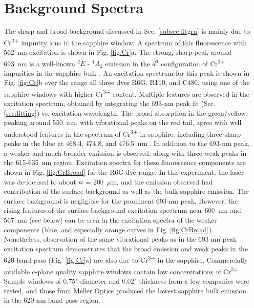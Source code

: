 \section{Background Spectra}
\label{sec:bgs} %

The sharp and broad background discussed in Sec. \ref{subsec:fitgrn} is mainly due to Cr\textsuperscript{3+} impurity ions in the sapphire window.  A spectrum of this fluorescence with 562~nm excitation is shown in Fig. \ref{fig:Cr}a.  The strong, sharp peak around 693~nm is a well-known $^{2}E$ - $^{4}A_{2}$ emission in the $d^{3}$ configuration of Cr\textsuperscript{3+} impurities in the sapphire bulk \cite{SapphireRlines1964,SapphireRlines2010}.  An excitation spectrum for this peak is shown in Fig. \ref{fig:Cr}b over the range all three dyes R6G, R110, and C480, using one of the sapphire windows with higher Cr\textsuperscript{3+} content.  Multiple features are observed in the excitation spectrum, obtained by integrating the 693-nm peak fit (Sec. \ref{sec:fitting}) vs. excitation wavelength.  The broad absorption in the green/yellow, peaking around 550~nm, with vibrational peaks on the red tail, agree with well understood features in the spectrum of Cr\textsuperscript{3+} in sapphire, including three sharp peaks in the blue at 468.4, 474.8, and 476.5~nm \cite{SapphireFord,SapphireMcclure}.  In addition to the 693-nm peak, a weaker and much broader emission is observed, along with three weak peaks in the 615-635~nm region.  Excitation spectra for these fluorescence components are shown in Fig. \ref{fig:CrBroad} for the R6G dye range.  In this experiment, the laser was de-focused to about w = 200~$\mu$m, and the emission observed had contribution of the surface background as well as the bulk sapphire emission.  The surface background is negligible for the prominent 693-nm peak.  However, the rising features of the surface background excitation spectrum near 600~nm and 567~nm (see below) can be seen in the excitation spectra of the weaker components (blue, and especially orange curves in Fig. \ref{fig:CrBroad}).  Nonetheless, observation of the same vibrational peaks as in the 693-nm peak excitation spectrum demonstrates that the broad emission and weak peaks in the 620 band-pass (Fig. \ref{fig:Cr}a) are also due to Cr\textsuperscript{3+} in the sapphire.  Commercially available c-plane quality sapphire windows contain low concentrations of Cr\textsuperscript{3+}.  Sample windows of 0.75" diameter and 0.02" thickness from a few companies were tested, and those from Meller Optics produced the lowest sapphire bulk emission in the 620-nm band-pass region.

